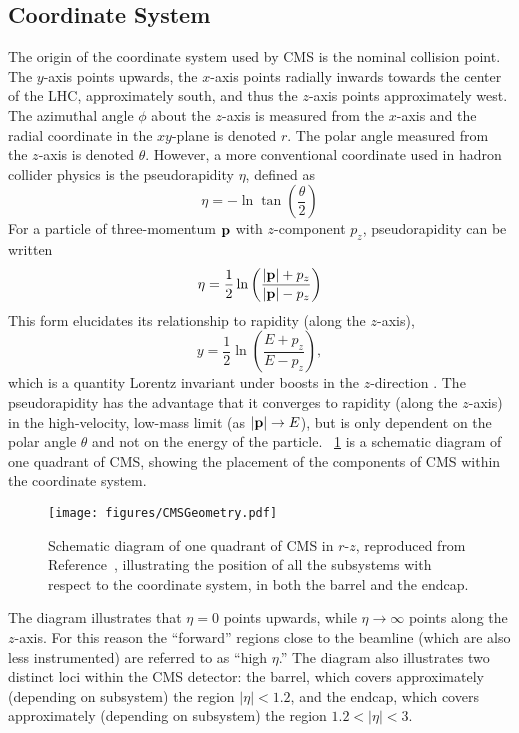 \subsection{Coordinate System}
The origin of the coordinate system used by CMS is the nominal \pp collision point.
The $y$-axis points upwards, the $x$-axis points radially inwards towards the center of the LHC, approximately south, and thus the $z$-axis points approximately west.
The azimuthal angle $\phi$ about the $z$-axis is measured from the $x$-axis and the radial coordinate in the $xy$-plane is denoted $r$.
The polar angle measured from the $z$-axis is denoted $\theta$.
However, a more conventional coordinate used in hadron collider physics is the pseudorapidity $\eta$, defined as
\begin{equation}
  \eta = -\ln\tan\left(\frac{\theta}{2}\right)
  \label{eq:eta}
\end{equation}
For a particle of three-momentum $\mathbf{p}$ with $z$-component $p_z$, pseudorapidity can be written
\begin{equation}
  \eta = \frac12\ln\left(\frac{|\mathbf{p}|+p_z}{|\mathbf{p}|-p_z}\right)
  \label{eq:eta_p}
\end{equation}
This form elucidates its relationship to rapidity (along the $z$-axis),
\begin{equation}
  y = \frac12\ln\left(\frac{E+p_z}{E-p_z}\right),
  \label{eq:rap}
\end{equation}
which is a quantity Lorentz invariant under boosts in the $z$-direction \cite{Hama:1981}.
The pseudorapidity has the advantage that it converges to rapidity (along the $z$-axis) in the high-velocity, low-mass limit (as $|\mathbf{p}|\to E$), but is only dependent on the polar angle $\theta$ and not on the energy of the particle.
\Fig~\ref{cms:quadrant} is a schematic diagram of one quadrant of CMS, showing the placement of the components of CMS within the coordinate system.
\begin{figure}[tpb]
  \centering
  \texttt{[image: figures/CMSGeometry.pdf]}
  \caption{Schematic diagram of one quadrant of CMS in $r$-$z$, reproduced from Reference~\cite{Sirunyan:2018fpa}, illustrating the position of all the subsystems with respect to the coordinate system, in both the barrel and the endcap.}
  \label{cms:quadrant}
\end{figure}

The diagram illustrates that $\eta = 0$ points upwards, while $\eta \to \infty$ points along the $z$-axis.
For this reason the ``forward'' regions close to the beamline (which are also less instrumented) are referred to as ``high $\eta$.''
The diagram also illustrates two distinct loci within the CMS detector: the barrel, which covers approximately (depending on subsystem) the region $|\eta| < 1.2$, and the endcap, which covers approximately (depending on subsystem) the region $1.2 < |\eta| < 3$.

